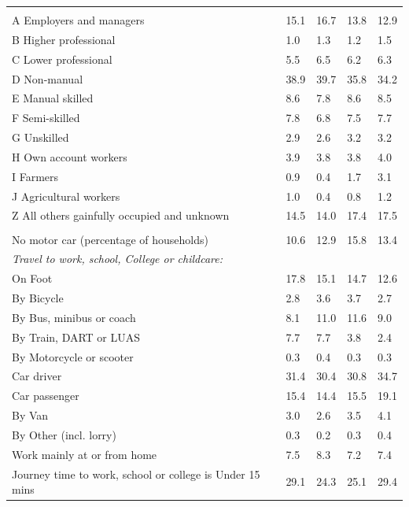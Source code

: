 \documentclass{article}
\begin{document}
\begin{table}[h]
\begin{tabular}{KTTTT}
\hline
    \\ 
    \hline
A Employers and managers & 15.1& 16.7& 13.8& 12.9\\
B Higher professional & 1.0& 1.3& 1.2& 1.5\\
C Lower professional & 5.5& 6.5& 6.2& 6.3\\
D Non-manual & 38.9& 39.7& 35.8& 34.2\\
E Manual skilled & 8.6& 7.8& 8.6& 8.5\\
F Semi-skilled & 7.8& 6.8& 7.5& 7.7\\
G Unskilled & 2.9& 2.6& 3.2& 3.2\\
H Own account workers & 3.9& 3.8& 3.8& 4.0\\
I Farmers & 0.9& 0.4& 1.7& 3.1\\
J Agricultural workers & 1.0& 0.4& 0.8& 1.2\\
Z All others gainfully occupied and unknown & 14.5& 14.0& 17.4& 17.5\\
\hline
{}\hline
    \\ 
    \hline
No motor car (percentage of households) & 10.6& 12.9& 15.8& 
13.4\\
    \hline 
\emph{Travel to work, school, College or childcare:} & & & \\
\quad On Foot & 17.8& 15.1& 14.7& 12.6\\ 
\quad By Bicycle & 2.8& 3.6& 3.7& 2.7\\ 
\quad By Bus, minibus or coach &  8.1& 11.0& 11.6&  9.0\\
\quad By Train, DART or LUAS & 7.7& 7.7& 3.8& 2.4\\
\quad By Motorcycle or scooter & 0.3& 0.4& 0.3& 0.3\\
\quad Car driver & 31.4 & 30.4& 30.8& 34.7\\
\quad Car passenger & 15.4& 14.4& 15.5& 19.1\\
\quad By Van & 3.0& 2.6& 3.5& 4.1\\
\quad By Other (incl. lorry) & 0.3& 0.2& 0.3& 0.4\\
    \hline
Work mainly at or from home & 7.5& 8.3& 7.2& 7.4\\
Journey time to work, school or college is Under 15 mins & 29.1& 24.3& 25.1& 29.4\\

\end{tabular}
\end{table}
\end{document}
